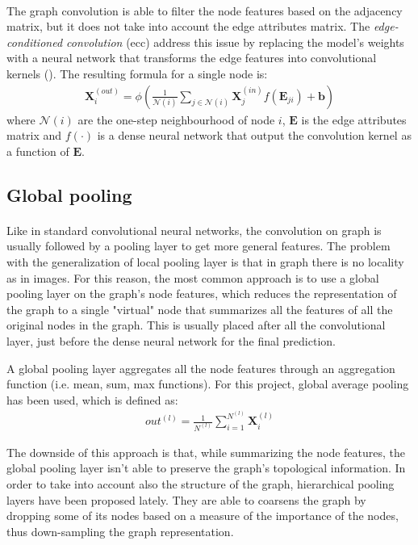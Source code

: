 \paragraph{} The graph convolution is able to filter the node features based on the adjacency matrix, but it does not take into account the edge attributes matrix. The \textit{edge-conditioned convolution} (\acs{ecc}) address this issue by replacing the model's weights with a neural network that transforms the edge features into convolutional kernels (\cite{arXiv:eccn}). The resulting formula for a single node is:
\begin{align}
    \mathbf{X}^{(out)}_i=\phi\left(\frac{1}{\mathcal{N}(i)} \sum_{j \in \mathcal{N}(i)} \mathbf{X}^{(in)}_j f(\mathbf{E}_{ji}) + \mathbf{b}\right)
\end{align}
where $\mathcal{N}(i)$ are the one-step neighbourhood of node $i$, $\mathbf{E}$ is the edge attributes matrix and $f(\cdot)$ is a dense neural network that output the convolution kernel as a function of $\mathbf{E}$.

\subsection{Global pooling}
\paragraph{} Like in standard convolutional neural networks, the convolution on graph is usually followed by a pooling layer to get more general features. The problem with the generalization of local pooling layer is that in graph there is no locality as in images. For this reason, the most common approach is to use a global pooling layer on the graph's node features, which reduces the representation of the graph to a single "virtual" node that summarizes all the features of all the original nodes in the graph. This is usually placed after all the convolutional layer, just before the dense neural network for the final prediction.

A global pooling layer aggregates all the node features through an aggregation function (i.e. mean, sum, max functions). For this project, global average pooling has been used, which is defined as:
\begin{align}
    out^{(l)} = \frac{1}{N^{(l)}} \sum_{i=1}^{N^{(l)}} \mathbf{X}^{(l)}_i
\end{align}

The downside of this approach is that, while summarizing the node features, the global pooling layer isn’t able to preserve the graph’s topological information. In order to take into account also the structure of the graph, hierarchical pooling layers have been proposed lately. They are able to coarsens the graph by dropping some of its nodes based on a measure of the importance of the nodes, thus down-sampling the graph representation.

